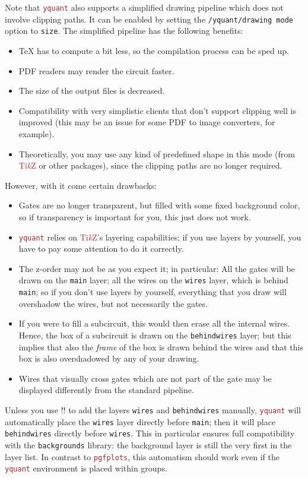 \documentclass{scrartcl}
\def\TikZ{\textcolor{brown}{Ti\textit kZ}}
\def\pkg#1{\textcolor{brown}{\texttt{#1}}}
\def\ttlink{\link\texttt}
\def\Yquant{\pkg{yquant}}
\begin{document}
         Note that \Yquant{} also supports a simplified drawing pipeline which does not involve clipping paths.
         It can be enabled by setting the \ttlink{/yquant/drawing mode} option to \texttt{size}.
         The simplified pipeline has the following benefits:
         \begin{itemize}
            \item \TeX{} has to compute a bit less, so the compilation process can be sped up.
            \item PDF readers may render the circuit faster.
            \item The size of the output files is decreased.
            \item Compatibility with very simplistic clients that don't support clipping well is improved (this may be an issue for some PDF to image converters, for example).
            \item Theoretically, you may use any kind of predefined shape in this mode (from \TikZ{} or other packages), since the clipping paths are no longer required.
         \end{itemize}
         However, with it come certain drawbacks:
         \begin{itemize}
            \item Gates are no longer transparent, but filled with some fixed background color, so if transparency is important for you, this just does not work.
            \item \Yquant{} relies on \TikZ's layering capabilities; if you use layers by yourself, you have to pay some attention to do it correctly.
            \item {}The z\hyp order may not be as you expect it; in particular:
               All the gates will be drawn on the \texttt{main} layer; all the wires on the \texttt{wires} layer, which is behind \texttt{main}; so if you don't use layers by yourself, everything that you draw will overshadow the wires, but not necessarily the gates.
            \item If you were to fill a subcircuit, this would then erase all the internal wires.
               Hence, the box of a subcircuit is drawn on the \texttt{behindwires} layer; but this implies that also the \emph{frame} of the box is drawn behind the wires and that this box is also overshadowed by any of your drawing.
            \item Wires that visually cross gates which are not part of the gate may be displayed differently from the standard pipeline.
         \end{itemize}
         Unless you use \tex!\pgfsetlayers! to add the layers \texttt{wires} and \texttt{behindwires} manually, \Yquant{} will automatically place the \texttt{wires} layer directly before \texttt{main}; then it will place \texttt{behindwires} directly before \texttt{wires}.
         This in particular ensures full compatibility with the \texttt{backgrounds} library: the background layer is still the very first in the layer list.
         In contrast to \pkg{pgfplots}, this automatism should work even if the \Yquant{} environment is placed within groups.
\end{document}
